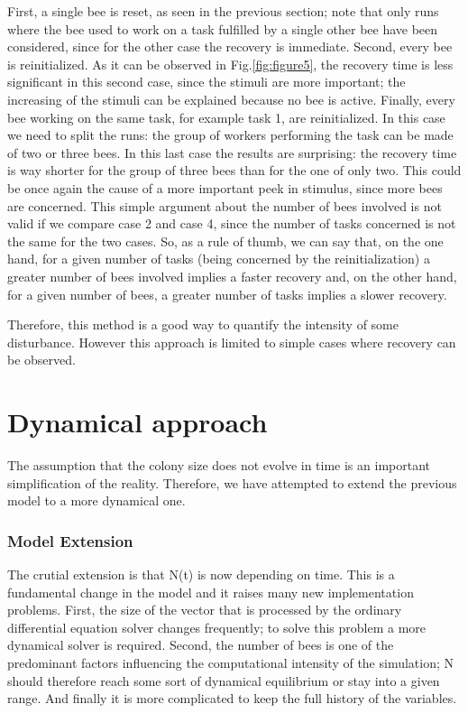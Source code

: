 First, a single bee is reset, as seen in the previous section; note
that only runs where the bee used to work on a task fulfilled by a
single other bee have been considered, since for the other case the
recovery is immediate. Second, every bee is reinitialized. As it can
be observed in Fig.\ref{fig:figure5}, the recovery time is less significant
in this second case, since the stimuli are more important; the increasing
of the stimuli can be explained because no bee is active. Finally,
every bee working on the same task, for example task 1, are reinitialized.
In this case we need to split the runs: the group of workers performing
the task can be made of two or three bees. In this last case the results
are surprising: the recovery time is way shorter for the group of
three bees than for the one of only two. This could be once again
the cause of a more important peek in stimulus, since more bees are
concerned. This simple argument about the number of bees involved
is not valid if we compare case 2 and case 4, since the number of
tasks concerned is not the same for the two cases. So, as a rule of
thumb, we can say that, on the one hand, for a given number of tasks
(being concerned by the reinitialization) a greater number of bees
involved implies a faster recovery and, on the other hand, for a given
number of bees, a greater number of tasks implies a slower recovery.

Therefore, this method is a good way to quantify the intensity of
some disturbance. However this approach is limited to simple cases
where recovery can be observed.


\section{Dynamical approach}

The assumption that the colony size does not evolve in time is an
important simplification of the reality. Therefore, we have attempted
to extend the previous model to a more dynamical one. 


\subsubsection{Model Extension}

The crutial extension is that N(t) is now depending on time. This
is a fundamental change in the model and it raises many new implementation
problems. First, the size of the vector that is processed by the ordinary
differential equation solver changes frequently; to solve this problem
a more dynamical solver is required. Second, the number of bees is
one of the predominant factors influencing the computational intensity
of the simulation; N should therefore reach some sort of dynamical
equilibrium or stay into a given range. And finally it is more complicated
to keep the full history of the variables.

